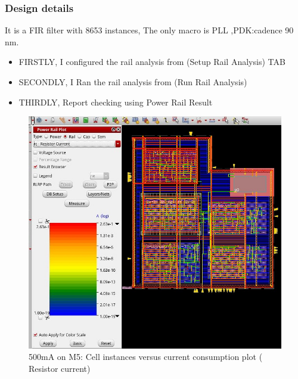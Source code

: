 \documentclass[a4paper]{article}
\begin{document}
\subsubsection{Design details}
\label{sec:org1e8a12c}
It is a FIR filter with 8653 instances, The only macro is PLL ,PDK:cadence 90 nm.

\begin{itemize}
\item FIRSTLY, I configured the rail analysis from (Setup Rail Analysis) TAB
\item SECONDLY, I Ran the rail analysis from (Run Rail Analysis)
\item THIRDLY, Report checking using Power Rail Result
\end{itemize}


\begin{figure}[htbp]
\centering
\includegraphics[width=.9\linewidth]{./img/era4.jpg}
\caption{\label{fig:orgb7b50f9}500mA on M5: Cell instances versus current consumption plot ( Resistor current)}
\end{figure}
\end{document}
